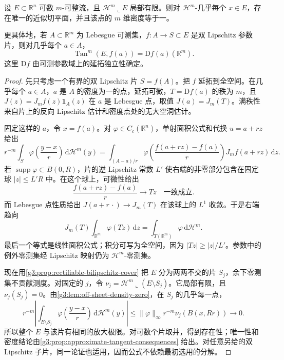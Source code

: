 \begin{theorem}\label{g3:thm:rectifiable-tangent-plane}
	设 \(E\subset\mathbb R^n\) 可数 \(m\)-可整流，且 \(\mathcal H^m\llcorner E\) 局部有限。则对 \(\mathcal H^m\)-几乎每个 \(x\in E\)，存在唯一的近似切平面，并且该点的 \(m\) 维密度等于一。

	更具体地，若 \(A\subset\mathbb R^m\) 为 Lebesgue 可测集，\(f:A\to S\subset E\) 是双 Lipschitz 参数片，则对几乎每个 \(a\in A\)，
	\begin{equation}\label{g3:eq:tangent-parametric-image}
		\operatorname{Tan}^m(E,f(a))=\mathrm Df(a)(\mathbb R^m).
	\end{equation}
	这里 \(\mathrm Df\) 由可测参数域上的延拓独立性确定。
\end{theorem}
\begin{proof}
	先只考虑一个有界的双 Lipschitz 片 \(S=f(A)\)。把 \(f\) 延拓到全空间。在几乎每个 \(a\in A\)，\(a\) 是 \(A\) 的密度为一的点，延拓可微，\(T=\mathrm Df(a)\) 的秩为 \(m\)，且
	\(J(z)=J_mf(z)\mathbf1_A(z)\) 在 \(a\) 是 Lebesgue 点，取值 \(J(a)=J_m(T)\)。满秩性来自片上的反向 Lipschitz 估计和密度点处的无大空洞估计。

	固定这样的 \(a\)，令 \(x=f(a)\)。对 \(\varphi\in C_c(\mathbb R^n)\)，单射面积公式和代换 \(u=a+rz\) 给出
	\[
		r^{-m}\int_S\varphi\!\left(\frac{y-x}{r}\right)\,\mathrm d\mathcal H^m(y)
		=\int_{(A-a)/r}
		\varphi\!\left(\frac{f(a+rz)-f(a)}r\right)J_mf(a+rz)\,\mathrm dz.
	\]
	若 \(\operatorname{supp}\varphi\subset B(0,R)\)，片的逆 Lipschitz 常数 \(L'\) 使右端的非零部分包含在固定球 \(|z|\le L'R\) 中。在这个球上，可微性给出
	\[
		\frac{f(a+rz)-f(a)}r\longrightarrow Tz
		\quad\text{一致成立}.
	\]
	而 Lebesgue 点性质给出 \(J(a+r\,\cdot)\to J_m(T)\) 在该球上的 \(L^1\) 收敛。于是右端趋向
	\[
		J_m(T)\int_{\mathbb R^m}\varphi(Tz)\,\mathrm dz
		=\int_{T(\mathbb R^m)}\varphi\,\mathrm d\mathcal H^m.
	\]
	最后一个等式是线性面积公式；积分可写为全空间，因为 \(|Tz|\ge |z|/L'\)。参数中的例外零测集经 Lipschitz 映射仍为 \(\mathcal H^m\)-零测集。

	现在用\cref{g3:prop:rectifiable-bilipschitz-cover} 把 \(E\) 分为两两不交的片 \(S_j\)，余下零测集不贡献测度。对固定的 \(j\)，令
	\(\nu_j=\mathcal H^m\llcorner(E\setminus S_j)\)。它局部有限，且 \(\nu_j(S_j)=0\)。由\cref{g3:lem:off-sheet-density-zero}，在 \(S_j\) 的几乎每一点，
	\[
		r^{-m}\left|\int_{E\setminus S_j}
		\varphi\!\left(\frac{y-x}{r}\right)\,\mathrm d\mathcal H^m(y)\right|
		\le \|\varphi\|_\infty r^{-m}\nu_j(B(x,Rr))
		\longrightarrow0.
	\]
	所以整个 \(E\) 与该片有相同的放大极限。对可数个片取并，得到存在性；唯一性和密度结论由\cref{g3:prop:approximate-tangent-consequences} 给出。对任意另给的双 Lipschitz 子片，同一论证也适用，因而公式不依赖最初选用的分解。
\end{proof}

